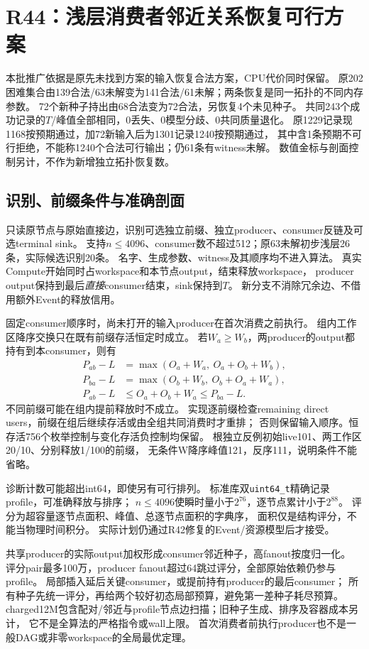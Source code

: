 \documentclass[UTF8,fontset=fandol,11pt]{ctexart}
\begin{document}
\section{R44：浅层消费者邻近关系恢复可行方案}
本批推广依据是原先未找到方案的输入恢复合法方案，CPU代价同时保留。
原202困难集合由139合法/63未解变为141合法/61未解；两条恢复是同一拓扑的不同内存参数。
72个新种子持出由68合法变为72合法，另恢复4个未见种子。
共同243个成功记录的$T$/峰值全部相同，0丢失、0模型分歧、0共同质量退化。
原1229记录现1168按预期通过，加72新输入后为1301记录1240按预期通过，
其中含1条预期不可行拒绝，不能称1240个合法可行输出；仍61条有witness未解。
数值金标与剖面控制另计，不作为新增独立拓扑恢复数。

\subsection{识别、前缀条件与准确剖面}
只读原节点与原始直接边，识别可选独立前缀、独立producer、consumer反链及可选terminal sink。
支持$n\le4096$、consumer数不超过512；原63未解初步浅层26条，实际候选识别20条。
名字、生成参数、witness及其顺序均不进入算法。
真实Compute开始同时占workspace和本节点output，结束释放workspace，
producer output保持到最后\emph{直接}consumer结束，sink保持到$T$。
新分支不消除冗余边、不借用额外Event的释放信用。

固定consumer顺序时，尚未打开的输入producer在首次消费之前执行。
组内工作区降序交换只在既有前缀存活恒定时成立。
若$W_a\ge W_b$，两producer的output都持有到本consumer，则有
\begin{align*}
 P_{ab}-L &= \max(O_a+W_a,\ O_a+O_b+W_b),\\
 P_{ba}-L &= \max(O_b+W_b,\ O_b+O_a+W_a),\\
 P_{ab}-L &\le O_a+O_b+W_a\le P_{ba}-L.
\end{align*}
不同前缀可能在组内提前释放时不成立。
实现逐前缀检查remaining direct users，前缀在组后继续存活或由全组共同消费时才重排；
否则保留输入顺序。恒存活756个枚举控制与变化存活负控制均保留。
根独立反例初始live101、两工作区20/10、分别释放1/100的前缀，
无条件W降序峰值121，反序111，说明条件不能省略。

诊断计数可能超出int64，即使另有可行排列。
标准库双\texttt{uint64\_t}精确记录profile，可准确释放与排序；
$n\le4096$使瞬时量小于$2^{76}$，逐节点累计小于$2^{88}$。
评分为超容量逐节点面积、峰值、总逐节点面积的字典序，
面积仅是结构评分，不能当物理时间积分。
实际计划仍通过R42修复的Event/资源模型后才接受。

共享producer的实际output加权形成consumer邻近种子，高fanout按度归一化。
评分pair最多100万，producer fanout超过64跳过评分，全部原始依赖仍参与profile。
局部插入延后关键consumer，或提前持有producer的最后consumer；
所有种子先统一评分，再给两个较好初态局部预算，避免第一差种子耗尽预算。
charged12M包含配对/邻近与profile节点边扫描；旧种子生成、排序及容器成本另计，
它不是全算法的严格指令或wall上限。
首次消费者前执行producer也不是一般DAG或非零workspace的全局最优定理。
\end{document}
